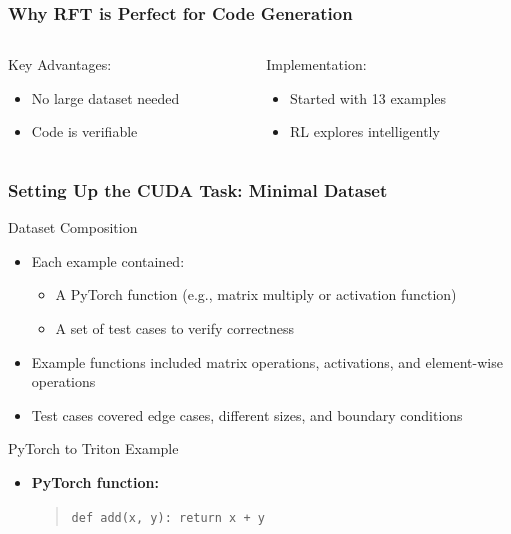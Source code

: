 \documentclass[aspectratio=169]{beamer}
\begin{document}
\begin{frame}[t]
	\frametitle{Why RFT is Perfect for Code Generation}
	\begin{columns}[T]
		\begin{column}{0.48\textwidth}
			\begin{block}{Key Advantages:}
				\begin{itemize}
					\item No large dataset needed
					\item Code is verifiable
				\end{itemize}
			\end{block}
		\end{column}
		\begin{column}{0.48\textwidth}
			\begin{block}{Implementation:}
				\begin{itemize}
					\item Started with 13 examples
					\item RL explores intelligently
				\end{itemize}
			\end{block}
		\end{column}
	\end{columns}
\end{frame}

\begin{frame}
	\frametitle{Setting Up the CUDA Task: Minimal Dataset}
	\begin{block}{Dataset Composition}
		\begin{itemize}
			\item Each example contained:
			\begin{itemize}
				\item A PyTorch function (e.g., matrix multiply or activation function)
				\item A set of test cases to verify correctness
			\end{itemize}
			\item Example functions included matrix operations, activations, and element-wise operations
			\item Test cases covered edge cases, different sizes, and boundary conditions
		\end{itemize}
	\end{block}
	\begin{block}{PyTorch to Triton Example}
	\begin{itemize}
		\item \textbf{PyTorch function:}
		\begin{quote}
		\texttt{def add(x, y): return x + y}
		\end{quote}
	\end{itemize}
	\end{block}
\end{frame}
\end{document}
